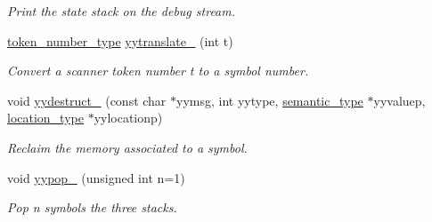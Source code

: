 \begin{DoxyCompactItemize}
\begin{DoxyCompactList}\small\item\em Print the state stack on the debug stream. \end{DoxyCompactList}\item 
\hypertarget{classyy_1_1CParser_a30d09fb144cf321e7825600401a16300}{\hyperlink{classyy_1_1CParser_afae3a386da0f1b35f4dad928f53782f6}{token\-\_\-number\-\_\-type} \hyperlink{classyy_1_1CParser_a30d09fb144cf321e7825600401a16300}{yytranslate\-\_\-} (int t)}\label{classyy_1_1CParser_a30d09fb144cf321e7825600401a16300}

\begin{DoxyCompactList}\small\item\em Convert a scanner token number {\itshape t} to a symbol number. \end{DoxyCompactList}\item 
void \hyperlink{classyy_1_1CParser_ac40cd3145a1359f2a16eeff9a37881fc}{yydestruct\-\_\-} (const char $\ast$yymsg, int yytype, \hyperlink{unionyy_1_1CParser_1_1semantic__type}{semantic\-\_\-type} $\ast$yyvaluep, \hyperlink{classyy_1_1CParser_a674649435d1e3521d1e820a5139f7232}{location\-\_\-type} $\ast$yylocationp)
\begin{DoxyCompactList}\small\item\em Reclaim the memory associated to a symbol. \end{DoxyCompactList}\item 
\hypertarget{classyy_1_1CParser_a29ff465a7ac1cb55ba50ad9b9a38378a}{void \hyperlink{classyy_1_1CParser_a29ff465a7ac1cb55ba50ad9b9a38378a}{yypop\-\_\-} (unsigned int n=1)}\label{classyy_1_1CParser_a29ff465a7ac1cb55ba50ad9b9a38378a}

\begin{DoxyCompactList}\small\item\em Pop {\itshape n} symbols the three stacks. \end{DoxyCompactList}\end{DoxyCompactItemize}
